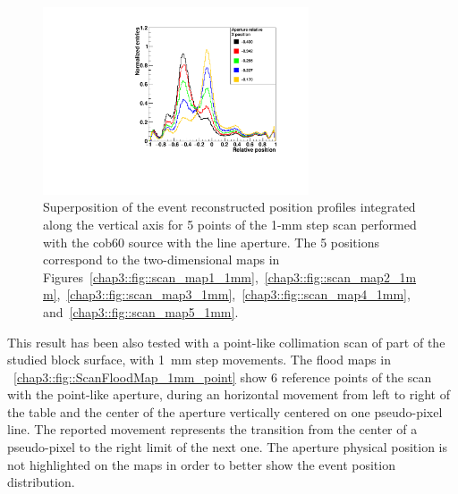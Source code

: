 \begin{figure} [!h]
\centering
\includegraphics[width=0.7\textwidth]{03_GraphicFiles/chapter3_CLaRySproto/Absorber/images_scan/line_1mm/superpositionProfiles.pdf}
\caption{Superposition of the event reconstructed position profiles integrated along the vertical axis for 5 points of the 1-mm step scan performed with the  \gls{cob60} source with the line aperture. The 5 positions correspond to the two-dimensional maps in Figures~\ref{chap3::fig::scan_map1_1mm},~\ref{chap3::fig::scan_map2_1mm},~\ref{chap3::fig::scan_map3_1mm},~\ref{chap3::fig::scan_map4_1mm}, and~\ref{chap3::fig::scan_map5_1mm}.}
\label{chap3::fig::profilesSuper}
\end{figure}

This result has been also tested with a point-like collimation scan of part of the studied block surface, with 1~mm step movements. The flood maps in \figurename~\ref{chap3::fig::ScanFloodMap_1mm_point} show 6 reference points of the scan with the point-like aperture, during an horizontal movement from left to right of the table and the center of the aperture vertically centered on one pseudo-pixel line. The reported movement represents the transition from the center of a pseudo-pixel to the right limit of the next one. The aperture physical position is not highlighted on the maps in order to better show the event position distribution. 

